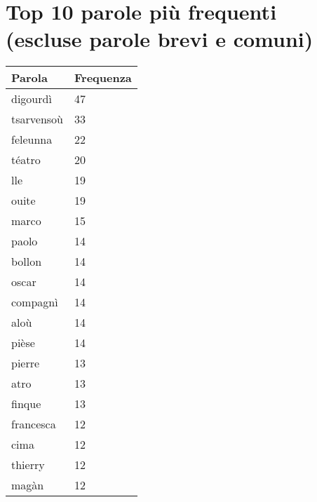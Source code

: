 \documentclass{article}
\begin{document}
\section*{Top 10 parole più frequenti (escluse parole brevi e comuni)}

\begin{tabular}{ll}
\toprule
\textbf{Parola} & \textbf{Frequenza} \\
\midrule
digourdì & 47 \\
tsarvensoù & 33 \\
feleunna & 22 \\
téatro & 20 \\
lle & 19 \\
ouite & 19 \\
marco & 15 \\
paolo & 14 \\
bollon & 14 \\
oscar & 14 \\
compagnì & 14 \\
aloù & 14 \\
pièse & 14 \\
pierre & 13 \\
atro & 13 \\
finque & 13 \\
francesca & 12 \\
cima & 12 \\
thierry & 12 \\
magàn & 12 \\
\bottomrule
\end{tabular}
\end{document}
